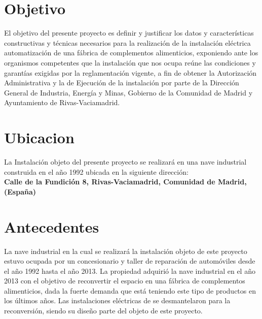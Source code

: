 \newpage
\section{Objetivo}
El objetivo del presente proyecto es definir y justificar los datos y características constructivas y técnicas necesarios para la realización de la instalación eléctrica automatización de una fábrica de complementos alimenticios, exponiendo ante los organismos competentes que la instalación que nos ocupa reúne las condiciones y garantías exigidas por la reglamentación vigente, a fin de obtener la Autorización Administrativa y la de Ejecución de la instalación por parte de la Dirección General de Industria, Energía y Minas, Gobierno de la Comunidad de Madrid y Ayuntamiento de Rivas-Vaciamadrid.\
 
\section{Ubicacion}

La Instalación objeto del presente proyecto se realizará en una nave industrial construida en el año 1992 ubicada en la siguiente dirección:\\

 {\bfseries Calle de la Fundición 8, Rivas-Vaciamadrid, Comunidad de Madrid, (España)}

\section{Antecedentes}

La nave industrial en la cual se realizará la instalación objeto de este proyecto estuvo ocupada por un concesionario y taller de reparación de automóviles desde el año 1992 hasta el año 2013. La propiedad adquirió la nave industrial en el año 2013 con el objetivo de reconvertir el espacio en una fábrica de complementos alimenticios, dada la fuerte demanda que está teniendo este tipo de productos en los últimos años. Las instalaciones eléctricas de se desmantelaron para la reconversión, siendo su diseño parte del objeto de este proyecto.\

